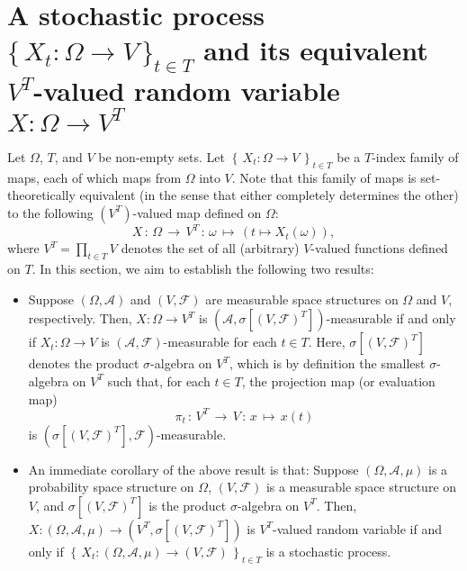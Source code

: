 

\section{A stochastic process $\{\,X_{t} : \Omega \longrightarrow V\,\}_{t\in T}$ and
its equivalent $V^{T}$-valued random variable $X : \Omega \longrightarrow V^{T}$}

\setcounter{theorem}{0}
\setcounter{equation}{0}

Let $\Omega$, $T$, and $V$ be non-empty sets.
Let $\left\{\,X_{t} : \Omega \longrightarrow V \,\right\}_{t \in T}$
be a $T$-index family of maps, each of which maps from $\Omega$ into $V$.
Note that this family of maps is set-theoretically equivalent
(in the sense that either completely determines the other)
to the following $(V^{T})$-valued map defined on $\Omega$:
\begin{equation*}
X \,:\, \Omega \,\longrightarrow\, V^{T} \,:\, \omega \,\longmapsto\, \left(t \longmapsto X_{t}(\omega)\right),
\end{equation*}
where $V^{T} = \prod_{t\in T}V$ denotes the set of all (arbitrary) $V$-valued functions defined on $T$.
In this section, we aim to establish the following two results:
\begin{itemize}

\item
Suppose $\left(\Omega,\mathcal{A}\right)$ and $\left(V,\mathcal{F}\right)$
are measurable space structures on $\Omega$ and $V$, respectively.
Then, $X : \Omega \longrightarrow V^{T}$ is
$\left(\mathcal{A},\sigma[(V,\mathcal{F})^{T}]\right)$-measurable if and only if
$X_{t} : \Omega \longrightarrow V$ is $(\mathcal{A},\mathcal{F})$-measurable for each $t \in T$.
Here, $\sigma[(V,\mathcal{F})^{T}]$ denotes the product $\sigma$-algebra on $V^{T}$,
which is by definition the smallest $\sigma$-algebra on $V^{T}$ such that,
for each $t \in T$, the projection map (or evaluation map)
\begin{equation*}
\pi_{t} \,:\, V^{T} \, \longrightarrow\, V
\,:\, x \,\longmapsto\, x(t)
\end{equation*}
is $\left(\sigma[(V,\mathcal{F})^{T}],\mathcal{F}\right)$-measurable.

\item
An immediate corollary of the above result is that:
Suppose $\left(\Omega,\mathcal{A},\mu\right)$ is a probability space structure on $\Omega$,
$\left(V,\mathcal{F}\right)$ is a measurable space structure on $V$, and
$\sigma[(V,\mathcal{F})^{T}]$ is the product $\sigma$-algebra on $V^{T}$.
Then, $X : (\Omega,\mathcal{A},\mu) \longrightarrow (V^{T},\sigma[(V,\mathcal{F})^{T}])$ is
$V^{T}$-valued random variable if and only if
$\left\{\,X_{t} : (\Omega,\mathcal{A},\mu) \longrightarrow (V,\mathcal{F})\,\right\}_{t\in T}$
is a stochastic process.

\end{itemize}

